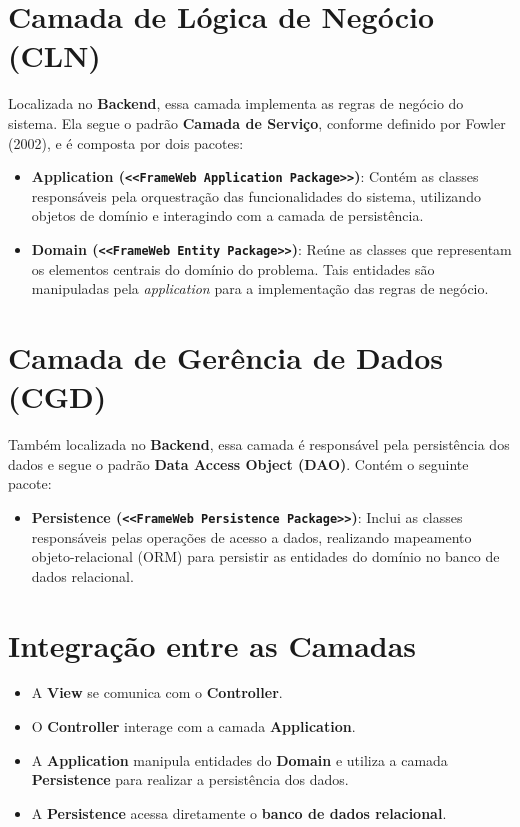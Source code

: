 \section{Camada de Lógica de Negócio (CLN)}

Localizada no \textbf{Backend}, essa camada implementa as regras de negócio do sistema. Ela segue o padrão \textbf{Camada de Serviço}, conforme definido por Fowler (2002), e é composta por dois pacotes:

\begin{itemize}
	\item \textbf{Application (\texttt{<<FrameWeb Application Package>>})}: Contém as classes responsáveis pela orquestração das funcionalidades do sistema, utilizando objetos de domínio e interagindo com a camada de persistência.
	\item \textbf{Domain (\texttt{<<FrameWeb Entity Package>>})}: Reúne as classes que representam os elementos centrais do domínio do problema. Tais entidades são manipuladas pela \textit{application} para a implementação das regras de negócio.
\end{itemize}

\section{Camada de Gerência de Dados (CGD)}

Também localizada no \textbf{Backend}, essa camada é responsável pela persistência dos dados e segue o padrão \textbf{Data Access Object (DAO)}. Contém o seguinte pacote:

\begin{itemize}
	\item \textbf{Persistence (\texttt{<<FrameWeb Persistence Package>>})}: Inclui as classes responsáveis pelas operações de acesso a dados, realizando mapeamento objeto-relacional (ORM) para persistir as entidades do domínio no banco de dados relacional.
\end{itemize}

\section{Integração entre as Camadas}

\begin{itemize}
	\item A \textbf{View} se comunica com o \textbf{Controller}.
	\item O \textbf{Controller} interage com a camada \textbf{Application}.
	\item A \textbf{Application} manipula entidades do \textbf{Domain} e utiliza a camada \textbf{Persistence} para realizar a persistência dos dados.
	\item A \textbf{Persistence} acessa diretamente o \textbf{banco de dados relacional}.
\end{itemize}


